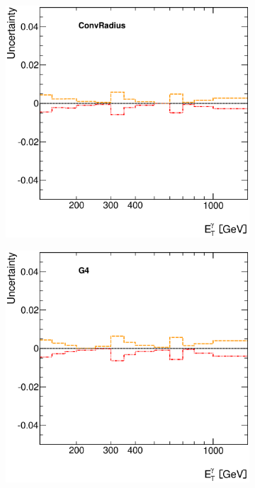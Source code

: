 \documentclass[12pt, twoside]{article}
\numberwithin{equation}{section}
\numberwithin{figure}{section}
\newenvironment{changemargin}[2]{%
\begin{list}{}{%
\setlength{\topsep}{0pt}%
\setlength{\leftmargin}{#1}%
\setlength{\rightmargin}{#2}%
\setlength{\listparindent}{\parindent}%
\setlength{\itemindent}{\parindent}%
\setlength{\parsep}{\parskip}%
}%
\item[]}{\end{list}}
\begin{document}
\begin{figure}[H]
\begin{changemargin}{-1.0cm}{-0.75cm}
\begin{changemargin}{-0.75cm}{-1.0cm}
\begin{subfigure}[b]{0.27\textwidth}
        \end{subfigure}
        \begin{subfigure}[b]{0.27\textwidth}
            \includegraphics[width=\textwidth]{./images/PhotonSystematics/PhotonSystematic-3.eps}
        \end{subfigure}
        \begin{subfigure}[b]{0.27\textwidth}
            \includegraphics[width=\textwidth]{./images/PhotonSystematics/PhotonSystematic-4.eps}
        \end{subfigure}


\end{changemargin}
\end{changemargin}
\end{figure}
\end{document}
